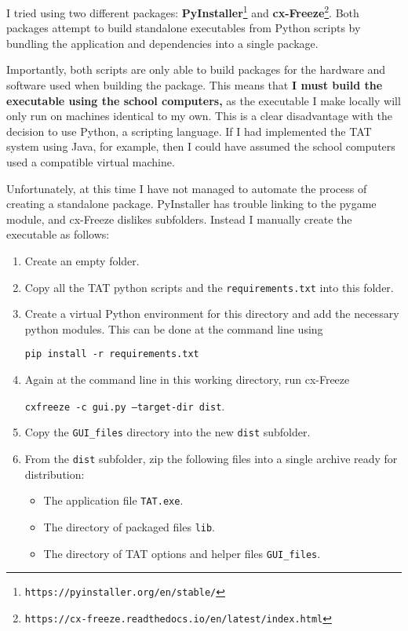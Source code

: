 \documentclass[10pt]{article}
\begin{document}
I tried using two different packages: \textbf{PyInstaller}\footnote{\texttt{https://pyinstaller.org/en/stable/}} and \textbf{cx-Freeze}\footnote{\texttt{https://cx-freeze.readthedocs.io/en/latest/index.html}}. Both packages attempt to build standalone executables from Python scripts by bundling the application and dependencies into a single package. 

Importantly, both scripts are only able to build packages for the hardware and software used when building the package. This means that \textbf{I must build the executable using the school computers,} as the executable I make locally will only run on machines identical to my own. This is a clear disadvantage with the decision to use Python, a scripting language. If I had implemented the TAT system using Java, for example, then I could have assumed the school computers used a compatible virtual machine.

Unfortunately, at this time I have not managed to automate the process of creating a standalone package. PyInstaller has trouble linking to the pygame module, and cx-Freeze dislikes subfolders. Instead I manually create the executable as follows:

\begin{enumerate}
\item Create an empty folder.
\item Copy all the TAT python scripts and the \texttt{requirements.txt} into this folder.
\item Create a virtual Python environment for this directory and add the necessary python modules. This can be done at the command line using

\texttt{pip install -r requirements.txt}

\item Again at the command line in this working directory, run cx-Freeze

\texttt{cxfreeze -c gui.py --target-dir dist}.

\item Copy the \texttt{GUI\_files} directory into the new \texttt{dist} subfolder.
\item From the \texttt{dist} subfolder, zip the following files into a single archive ready for distribution:
\begin{itemize}
\item The application file \texttt{TAT.exe}.
\item The directory of packaged files \texttt{lib}.
\item The directory of TAT options and helper files \texttt{GUI\_files}.
\end{itemize}
\end{enumerate}
\end{document}

